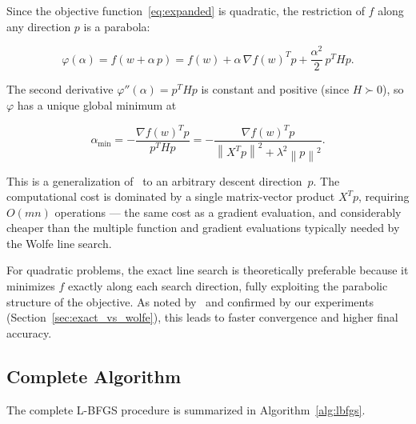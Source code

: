 \documentclass[11pt,a4paper]{article}
\newcommand{\norm}[1]{\left\|#1\right\|}
\begin{document}
Since the objective function~\eqref{eq:expanded} is quadratic, the restriction of $f$ 
along any direction $p$ is a parabola:

\begin{equation}
    \varphi(\alpha) = f(w + \alpha\, p) 
    = f(w) + \alpha\,\nabla f(w)^T p + \frac{\alpha^2}{2}\,p^T H p.
\end{equation}

The second derivative $\varphi''(\alpha) = p^T H p$ is constant and positive (since $H \succ 0$), 
so $\varphi$ has a unique global minimum at

\begin{equation}
\label{eq:exact_alpha}
    \alpha_{\min} = -\frac{\nabla f(w)^T p}{p^T H p} 
    = -\frac{\nabla f(w)^T p}{\norm{X^T p}^2 + \lambda^2\norm{p}^2}.
\end{equation}

This is a generalization of~\cite[Eq.~3.25]{nocedal2006numerical} to an arbitrary descent 
direction~$p$. The computational cost is dominated by a single matrix-vector product 
$X^T p$, requiring $O(mn)$ operations --- the same cost as a gradient evaluation, and 
considerably cheaper than the multiple function and gradient evaluations typically needed 
by the Wolfe line search.

For quadratic problems, the exact line search is theoretically preferable because it 
minimizes $f$ exactly along each search direction, fully exploiting the parabolic structure 
of the objective. As noted by~\cite{liu1989limited} and confirmed by our experiments 
(Section~\ref{sec:exact_vs_wolfe}), this leads to faster convergence and higher final accuracy.


\subsection{Complete Algorithm}

The complete L-BFGS procedure is summarized in Algorithm~\ref{alg:lbfgs}.
\end{document}
